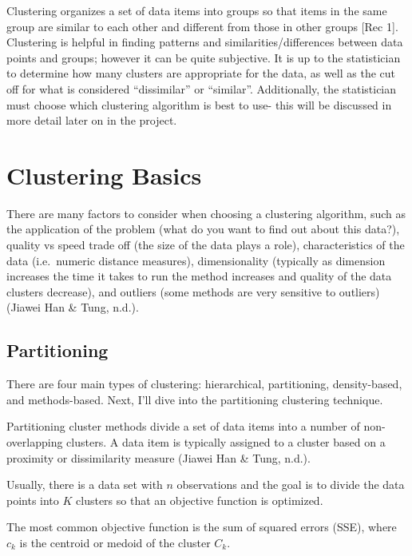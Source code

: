 \documentclass[12pt,twoside]{amherstthesis}
\begin{document}
  Clustering organizes a set of data items into groups so that items in
  the same group are similar to each other and different from those in
  other groups {[}Rec 1{]}. Clustering is helpful in finding patterns and
  similarities/differences between data points and groups; however it can
  be quite subjective. It is up to the statistician to determine how many
  clusters are appropriate for the data, as well as the cut off for what
  is considered ``dissimilar'' or ``similar''. Additionally, the
  statistician must choose which clustering algorithm is best to use- this
  will be discussed in more detail later on in the project.
  
  \chapter{Clustering Basics}\label{rmd-basics}
  
  There are many factors to consider when choosing a clustering algorithm,
  such as the application of the problem (what do you want to find out
  about this data?), quality vs speed trade off (the size of the data
  plays a role), characteristics of the data (i.e.~numeric distance
  measures), dimensionality (typically as dimension increases the time it
  takes to run the method increases and quality of the data clusters
  decrease), and outliers (some methods are very sensitive to outliers)
  (Jiawei Han \& Tung, n.d.).
  
  \section{Partitioning}\label{partitioning}
  
  There are four main types of clustering: hierarchical, partitioning,
  density-based, and methods-based. Next, I'll dive into the partitioning
  clustering technique.
  
  Partitioning cluster methods divide a set of data items into a number of
  non-overlapping clusters. A data item is typically assigned to a cluster
  based on a proximity or dissimilarity measure (Jiawei Han \& Tung,
  n.d.).
  
  Usually, there is a data set with \(n\) observations and the goal is to
  divide the data points into \(K\) clusters so that an objective function
  is optimized.
  
  The most common objective function is the sum of squared errors (SSE),
  where \(c_k\) is the centroid or medoid of the cluster \(C_k\).
  
\end{document}
